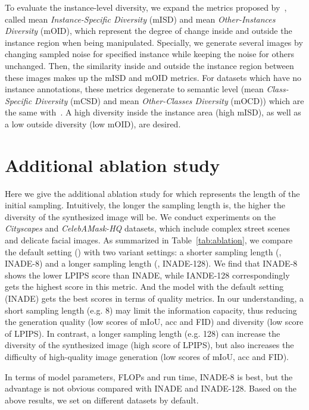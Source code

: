 \documentclass[final]{cvpr}
\begin{document}
To evaluate the instance-level diversity, we expand the metrics proposed by~\cite{zhu2020semantically}, called mean \textit{Instance-Specific Diversity} (mISD) and mean \textit{Other-Instances Diversity} (mOID), which represent the degree of change inside and outside the instance region when being manipulated. Specially, we generate several images by changing sampled noise for specified instance while keeping the noise for others unchanged. Then, the similarity inside and outside the instance region between these images makes up the mISD and mOID metrics. For datasets which have no instance annotations, these metrics degenerate to semantic level (mean \textit{Class-Specific Diversity} (mCSD) and mean \textit{Other-Classes Diversity} (mOCD)) which are the same with~\cite{zhu2020semantically}. A high diversity inside the instance area (high mISD), as well as a low outside diversity (low mOID), are desired.

\section{Additional ablation study}
Here we give the additional ablation study for  which represents the length of the initial sampling. Intuitively, the longer the sampling length is, the higher the diversity of the synthesized image will be. We conduct experiments on the \textit{Cityscapes} and \textit{CelebAMask-HQ} datasets, which include complex street scenes and delicate facial images. As summarized in Table~\ref{tab:ablation}, we compare the default setting () with two variant settings: a shorter sampling length (, INADE-8) and a longer sampling length (, INADE-128). We find that INADE-8 shows the lower LPIPS score than INADE, while IANDE-128 correspondingly gets the highest score in this metric. And the model with the default setting (INADE) gets the best scores in terms of quality metrics. In our understanding, a short sampling length (e.g. 8) may limit the information capacity, thus reducing the generation quality (low scores of mIoU, acc and FID) and diversity (low score of LPIPS). In contrast, a longer sampling length (e.g. 128) can increase the diversity of the synthesized image (high score of LPIPS), but also increases the difficulty of high-quality image generation (low scores of mIoU, acc and FID). 

In terms of model parameters, FLOPs and run time, INADE-8 is best, but the advantage is not obvious compared with INADE and INADE-128. Based on the above results, we set  on different datasets by default. 
\end{document}
